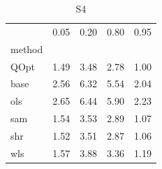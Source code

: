 \begin{table}
\caption{S4}
\label{ }
\begin{tabular}{lrrrr}
\toprule
 & 0.05 & 0.20 & 0.80 & 0.95 \\
method &  &  &  &  \\
\midrule
QOpt & 1.49 & 3.48 & 2.78 & 1.00 \\
base & 2.56 & 6.32 & 5.54 & 2.04 \\
ols & 2.65 & 6.44 & 5.90 & 2.23 \\
sam & 1.54 & 3.53 & 2.89 & 1.07 \\
shr & 1.52 & 3.51 & 2.87 & 1.06 \\
wls & 1.57 & 3.88 & 3.36 & 1.19 \\
\bottomrule
\end{tabular}
\end{table}
